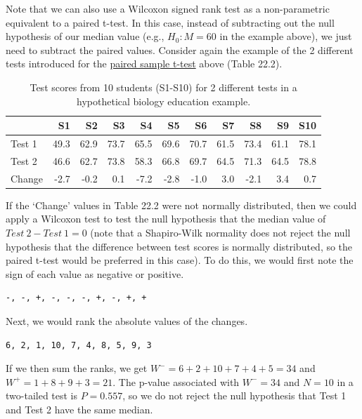 \documentclass[
  openany]{scrbook}
\begin{document}
Note that we can also use a Wilcoxon signed rank test as a non-parametric equivalent to a paired t-test.
In this case, instead of subtracting out the null hypothesis of our median value (e.g., \(H_{0}: M = 60\) in the example above), we just need to subtract the paired values.
Consider again the example of the 2 different tests introduced for the \protect\hyperlink{paired-sample-t-test}{paired sample t-test} above (Table 22.2).

\begin{table}

\caption{\label{tab:unnamed-chunk-86}Test scores from 10 students (S1-S10) for 2 different tests in a hypothetical biology education example.}
\centering
\begin{tabular}[t]{l|r|r|r|r|r|r|r|r|r|r}
\hline
  & S1 & S2 & S3 & S4 & S5 & S6 & S7 & S8 & S9 & S10\\
\hline
Test 1 & 49.3 & 62.9 & 73.7 & 65.5 & 69.6 & 70.7 & 61.5 & 73.4 & 61.1 & 78.1\\
\hline
Test 2 & 46.6 & 62.7 & 73.8 & 58.3 & 66.8 & 69.7 & 64.5 & 71.3 & 64.5 & 78.8\\
\hline
Change & -2.7 & -0.2 & 0.1 & -7.2 & -2.8 & -1.0 & 3.0 & -2.1 & 3.4 & 0.7\\
\hline
\end{tabular}
\end{table}

If the `Change' values in Table 22.2 were not normally distributed, then we could apply a Wilcoxon test to test the null hypothesis that the median value of \(Test\:2 - Test\:1 = 0\) (note that a Shapiro-Wilk normality does not reject the null hypothesis that the difference between test scores is normally distributed, so the paired t-test would be preferred in this case).
To do this, we would first note the sign of each value as negative or positive.

\begin{verbatim}
-, -, +, -, -, -, +, -, +, +
\end{verbatim}

Next, we would rank the absolute values of the changes.

\begin{verbatim}
6, 2, 1, 10, 7, 4, 8, 5, 9, 3
\end{verbatim}

If we then sum the ranks, we get \(W^{-} = 6 + 2 + 10 + 7 + 4 + 5 = 34\) and \(W^{+} = 1 + 8 + 9 + 3 = 21\).
The p-value associated with \(W^{-} = 34\) and \(N = 10\) in a two-tailed test is \(P = 0.557\), so we do not reject the null hypothesis that Test 1 and Test 2 have the same median.
\end{document}
